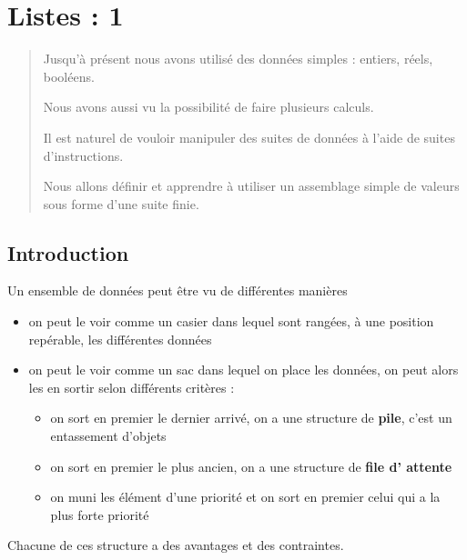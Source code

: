 \chapter{Listes : 1}
\thispagestyle{empty}
\begin{abstract}
Jusqu’à présent nous avons utilisé des données simples : 
entiers, réels, booléens.

Nous avons aussi vu la possibilité de faire plusieurs calculs.

Il est naturel de vouloir manipuler des suites de données à l'aide de suites d'instructions.

Nous allons définir et apprendre à utiliser un assemblage simple de valeurs sous forme d'une suite finie.
\end{abstract}
\section{Introduction}
Un ensemble de données peut être vu de différentes manières
\begin{itemize}
\item on peut le voir comme un casier dans lequel sont rangées, à une position repérable, les différentes données
\item on peut le voir comme un sac dans lequel on place les données, on peut alors les en sortir selon différents critères : 
\begin{itemize}
\item on sort en premier le dernier arrivé, on a une structure de {\bf pile}, c'est un entassement d'objets 
\item on sort en premier le plus ancien, on a une structure de {\bf file d' attente}
\item on muni les élément d'une priorité et on sort en premier celui qui a la plus forte priorité
\end{itemize}
\end{itemize}
Chacune de ces structure a des avantages et des contraintes.


